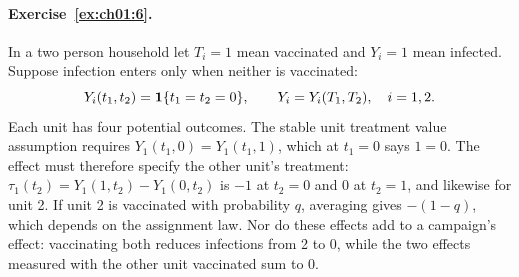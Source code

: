 \paragraph{Exercise~\ref{ex:ch01:6}.} In a two person household let $T_i=1$ mean vaccinated and $Y_i=1$ mean infected. Suppose infection enters only when neither is vaccinated:
\[
Y_i(t_1,t_2)=\mathbf{1}\{t_1=t_2=0\},\qquad Y_i=Y_i(T_1,T_2),\quad i=1,2.
\]
Each unit has four potential outcomes. The stable unit treatment value assumption requires $Y_1(t_1,0)=Y_1(t_1,1)$, which at $t_1=0$ says $1=0$. The effect must therefore specify the other unit's treatment: $\tau_1(t_2)=Y_1(1,t_2)-Y_1(0,t_2)$ is $-1$ at $t_2=0$ and $0$ at $t_2=1$, and likewise for unit 2. If unit 2 is vaccinated with probability $q$, averaging gives $-(1-q)$, which depends on the assignment law. Nor do these effects add to a campaign's effect: vaccinating both reduces infections from 2 to 0, while the two effects measured with the other unit vaccinated sum to 0.

